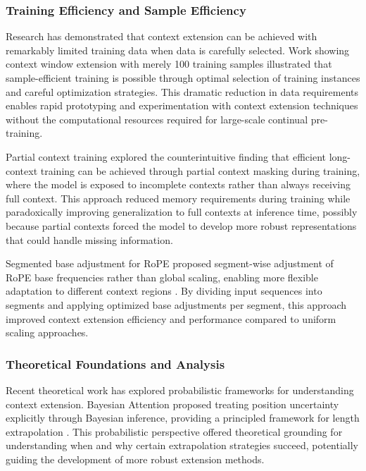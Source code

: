 \documentclass[11pt,letterpaper]{article}
\begin{document}
\subsubsection{Training Efficiency and Sample Efficiency}

Research has demonstrated that context extension can be achieved with remarkably limited training data when data is carefully selected. Work showing context window extension with merely 100 training samples illustrated that sample-efficient training is possible through optimal selection of training instances and careful optimization strategies. This dramatic reduction in data requirements enables rapid prototyping and experimentation with context extension techniques without the computational resources required for large-scale continual pre-training.

Partial context training explored the counterintuitive finding that efficient long-context training can be achieved through partial context masking during training, where the model is exposed to incomplete contexts rather than always receiving full context. This approach reduced memory requirements during training while paradoxically improving generalization to full contexts at inference time, possibly because partial contexts forced the model to develop more robust representations that could handle missing information.

Segmented base adjustment for RoPE proposed segment-wise adjustment of RoPE base frequencies rather than global scaling, enabling more flexible adaptation to different context regions \cite{kim2024extending}. By dividing input sequences into segments and applying optimized base adjustments per segment, this approach improved context extension efficiency and performance compared to uniform scaling approaches.

\subsubsection{Theoretical Foundations and Analysis}

Recent theoretical work has explored probabilistic frameworks for understanding context extension. Bayesian Attention proposed treating position uncertainty explicitly through Bayesian inference, providing a principled framework for length extrapolation \cite{chen2025bayesian}. This probabilistic perspective offered theoretical grounding for understanding when and why certain extrapolation strategies succeed, potentially guiding the development of more robust extension methods.
\end{document}
